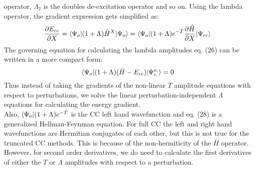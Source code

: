 operator, $\Lambda_2$ is the doubles de-excitation operator and so on.  
Using the lambda operator, the gradient expression gets simplified as:
\begin{equation}
\frac{\partial{E_{cc}}}{\partial X} = \langle \Psi_o |(1 + \Lambda){\bar{H}}^X| \Psi_o \rangle = \langle \Psi_o |(1 + \Lambda)e^{-\hat{T}}\frac{\partial{\hat H}}{\partial X}| \Psi_{cc} \rangle
\end{equation}
The governing equation for calculating the lambda amplitudes eq. (26) can be written
in a more compact form:
\begin{equation}
\langle \Psi_o |(1 + \Lambda)(\bar{H} - E_{cc})| {\Psi}^{a.}_{i.} \rangle = 0
\end{equation}
Thus instead of taking the gradients of the non-linear $T$ amplitude
equations with respect to perturbations, we solve the linear perturbation-independent 
$\Lambda$ equations for calculating the energy gradient.\\
Also, $\langle \Psi_o |(1 + \Lambda)e^{-\hat{T}}$ is the CC left hand wavefunction and 
eq. (28) is a generalized Hellman-Feynman equation\cite{Feynman39}. For full CC the left and 
right hand wavefunctions are Hermitian conjugates of each other, but this is not true for 
the truncated CC methods. This is because of the non-hermiticity of the $\bar{H}$ operator.
However, for second order derivatives, we do need to calculate the first derivatives of 
either the $T$ or $\Lambda$ amplitudes with respect to a perturbation.

